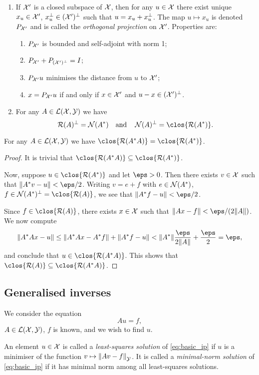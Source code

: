 \begin{recap}
\begin{enumerate}
        \item If $\XX'$ is a closed subspace of $\XX$, then for any $u \in \XX$ there exist unique $x_u \in \XX'$, $x_u\P \in (\XX')\P$ such that $u = x_u + x_u\P$. The map $u \mapsto x_u$ is denoted $P_{\XX'}$ and is called the \emph{orthogonal projection} on $\XX'$. Properties are:
        \begin{enumerate}
            \item $P_{\XX'}$ is bounded and self-adjoint with norm 1;
            \item $P_{\XX'} + P_{(\XX')\P} = I$;
            \item $P_{\XX'}u$ minimises the distance from $u$ to $\XX'$;
            \item $x = P_{\XX'}u$ if and only if $x \in \XX'$ and $u - x \in (\XX')\P$. 
        \end{enumerate}
    
    \item For any $A \in \LL(\XX, \YY)$ we have
    \[
    \Ran(A)\P = \Nul(A^*) \quad\text{and}\quad \Nul(A)\P = \clos{\Ran(A^*)}. 
    \]

     \end{enumerate}
\end{recap}

\begin{lemma}
    For any $A \in \LL(\XX, \YY)$ we have $\clos{\Ran(A^*A)} = \clos{\Ran(A^*)}$. 
\end{lemma}

\begin{proof}
    It is trivial that $\clos{\Ran(A^*A)} \subseteq \clos{\Ran(A^*)}$. 
    
    Now, suppose $u \in \clos{\Ran(A^*)}$ and let $\eps > 0$. Then there exists $v \in \XX$ such that $\norm{A^*v - u} < \eps/2$. Writing $v = e + f$ with $e \in \Nul(A^*)$, $f \in \Nul(A^*)\P = \clos{\Ran(A)}$, we see that $\norm{A^*f - u} < \eps/2$. 
    
    Since $f \in \clos{\Ran(A)}$, there exists $x \in \XX$ such that $\norm{Ax - f} < \eps/(2\norm{A})$. We now compute
    \[
    \norm{A^* A x - u} \leq \norm{A^*A x - A^* f} + \norm{A^*f - u} < \norm{A^*} \frac{\eps}{2\norm{A}} + \frac\eps2 = \eps, 
    \]
    and conclude that $u \in \clos{\Ran(A^*A)}$. This shows that $\clos{\Ran(A)} \subseteq \clos{\Ran(A^*A)}$. 
\end{proof}

\subsection{Generalised inverses}
We consider the equation \begin{equation} \label{eq:basic_ip}
    Au = f,
\end{equation} $A \in \LL(\XX, \YY)$, $f$ is known, and we wish to find $u$. 
\begin{definition}
    An element $u \in \XX$ is called a \emph{least-squares solution} of \cref{eq:basic_ip} if $u$ is a minimiser of the function $v \mapsto \norm{Av - f}_\YY$. It is called a \emph{minimal-norm solution} of \cref{eq:basic_ip} if it has minimal norm among all least-squares solutions. 
\end{definition}

